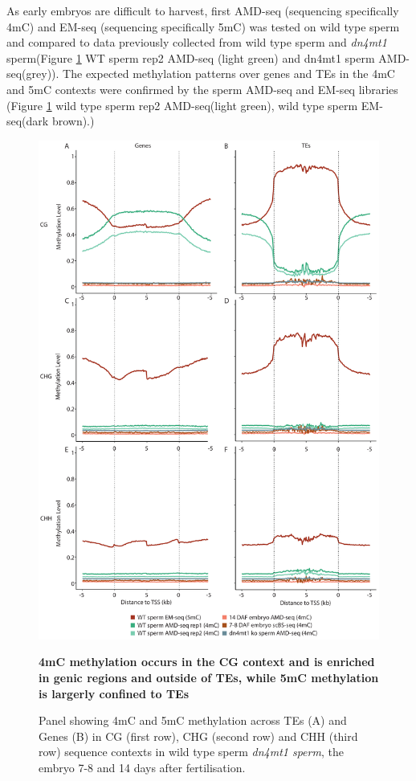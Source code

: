 As early embryos are difficult to harvest, first AMD-seq (sequencing specifically 4mC) and EM-seq (sequencing specifically 5mC) was tested on wild type sperm and compared to data previously collected from wild type sperm and \textit{dn4mt1} sperm(Figure \ref{fig:ends_analysis} WT sperm rep2 AMD-seq (light green) and dn4mt1 sperm AMD-seq(grey)). The expected methylation patterns over genes and TEs in the 4mC and 5mC contexts were confirmed by the sperm AMD-seq and EM-seq libraries (Figure \ref{fig:ends_analysis} wild type sperm rep2 AMD-seq(light green), wild type sperm EM-seq(dark brown).) 

\begin{figure}[htbp!] 
\centering    
    \includegraphics[width=1\textwidth]{Chapter3/Figs/Figure2_ends_analysis.pdf}
\caption{\textbf{4mC methylation occurs in the CG context and is enriched in genic regions and outside of TEs, while 5mC methylation is largerly confined to TEs}}
\label{fig:ends_analysis}
\captionsetup{font=small}
    \caption*{Panel showing 4mC and 5mC methylation across TEs (A) and Genes (B) in CG (first row), CHG (second row) and CHH (third row) sequence contexts in wild type sperm \textit{dn4mt1 sperm}, the embryo 7-8 and 14 days after fertilisation.}
\end{figure}

